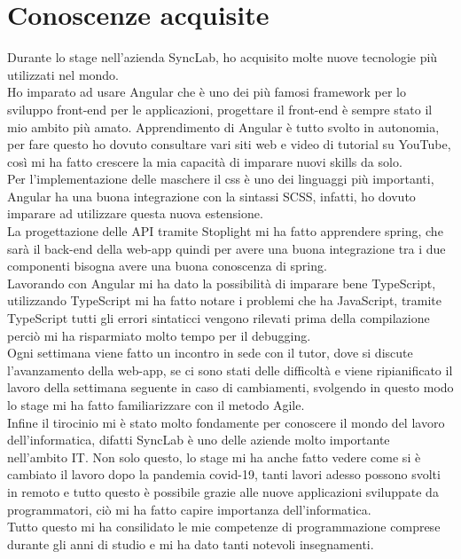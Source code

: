 \section{Conoscenze acquisite}
Durante lo stage nell'azienda SyncLab, ho acquisito molte nuove tecnologie più utilizzati nel mondo.\\
Ho imparato ad usare Angular che è uno dei più famosi framework per lo sviluppo front-end per le applicazioni, progettare il front-end è sempre stato il mio ambito più amato. Apprendimento di Angular è tutto svolto in autonomia, per fare questo ho dovuto consultare vari siti web e video di tutorial su YouTube, così mi ha fatto crescere la mia capacità di imparare nuovi skills da solo.\\
Per l'implementazione delle maschere il css è uno dei linguaggi più importanti, Angular ha una buona integrazione con la sintassi SCSS, infatti, ho dovuto imparare ad utilizzare questa nuova estensione.\\
La progettazione delle API tramite Stoplight mi ha fatto apprendere spring, che sarà il back-end della web-app quindi per avere una buona integrazione tra i due componenti bisogna avere una buona conoscenza di spring.\\
Lavorando con Angular mi ha dato la possibilità di imparare bene TypeScript, utilizzando TypeScript mi ha fatto notare i problemi che ha JavaScript, tramite TypeScript tutti gli errori sintaticci vengono rilevati prima della compilazione perciò mi ha risparmiato molto tempo per il debugging.\\
Ogni settimana viene fatto un incontro in sede con il tutor, dove si discute l'avanzamento della web-app, se ci sono stati delle difficoltà e viene ripianificato il lavoro della settimana seguente in caso di cambiamenti, svolgendo in questo modo lo stage mi ha fatto familiarizzare con il metodo Agile.\\
Infine il tirocinio mi è stato molto fondamente per conoscere il mondo del lavoro dell'informatica, difatti SyncLab è uno delle aziende molto importante nell'ambito IT. Non solo questo, lo stage mi ha anche fatto vedere come si è cambiato il lavoro dopo la pandemia covid-19, tanti lavori adesso possono svolti in remoto e tutto questo è possibile grazie alle nuove applicazioni sviluppate da programmatori, ciò mi ha fatto capire importanza dell'informatica.\\
Tutto questo mi ha consilidato le mie competenze di programmazione comprese durante gli anni di studio e mi ha dato tanti notevoli insegnamenti.
